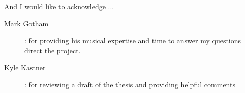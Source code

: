 
\begin{acknowledgements}


And I would like to acknowledge ...

\begin{description}
  \item[Mark Gotham]: for providing his musical expertise and time to answer my questions
    direct the project.
  \item[Kyle Kastner]: for reviewing a draft of the thesis and providing helpful comments
\end{description}


\end{acknowledgements}
